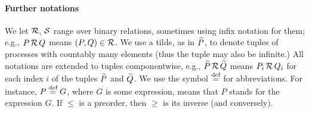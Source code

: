 \paragraph{Further notations}
We let $\R$, $\S$ range over binary relations, sometimes using 
 infix notation for them; e.g., 
$P \,\R\, Q$ means $(P,Q) \in \R$.
We use a tilde, as in  $\til P$, to denote tuples of processes with
countably many elements (thus the tuple may also be infinite.)
All notations are extended to tuples componentwise,
e.g., $\til P \,\R\, \til Q$ means $P_i \,\R\, Q_i$ for each  
index $i$ of the tuples $\til P$ and $\til Q$.
We use the symbol $\DSdefi$ for abbreviations. For instance, $P \DSdefi G $, where
$G$ is some expression, means that $P$ stands for the expression $G$.
If $\leq$ is a preorder, then  $\geq$  is its inverse (and
conversely).


